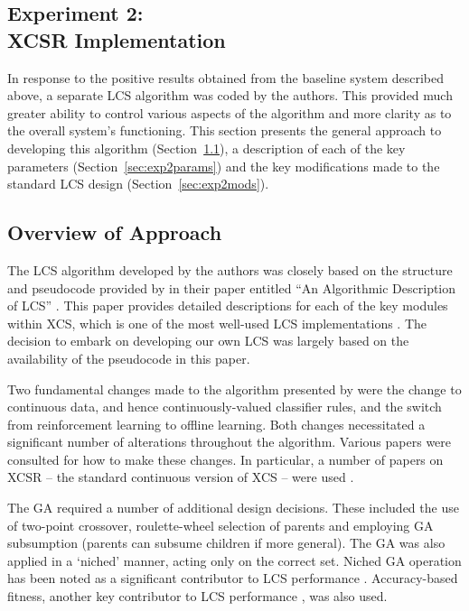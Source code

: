 \documentclass[11pt]{article}
\begin{document}
\begin{multicols}{2}
\section{Experiment 2:\\XCSR Implementation}
\label{sec:exp2}

In response to the positive results obtained from the baseline system described above, a separate LCS algorithm was coded by the authors. This provided much greater ability to control various aspects of the algorithm and more clarity as to the overall system's functioning. This section presents the general approach to developing this algorithm (Section~\ref{sec:exp2appr}), a description of each of the key parameters (Section~\ref{sec:exp2params}) and the key modifications made to the standard LCS design (Section~\ref{sec:exp2mods}).





\subsection{Overview of Approach}
\label{sec:exp2appr}

The LCS algorithm developed by the authors was closely based on the structure and pseudocode provided by \citeauthor{Butz2000} in their paper entitled ``An Algorithmic Description of LCS'' \cite{Butz2000}. This paper provides detailed descriptions for each of the key modules within XCS, which is one of the most well-used LCS implementations \cite{Sigaud2007}. The decision to embark on developing our own LCS was largely based on the availability of the pseudocode in this paper.

Two fundamental changes made to the algorithm presented by \citeauthor{Butz2000} were the change to continuous data, and hence continuously-valued classifier rules, and the switch from reinforcement learning to offline learning. Both changes necessitated a significant number of alterations throughout the algorithm. Various papers were consulted for how to make these changes. In particular, a number of papers on XCSR -- the standard continuous version of XCS -- were used \cite{Sowden2007,Stone2003,Wilson2000,Behdad2012}.

The GA required a number of additional design decisions. These included the use of two-point crossover, roulette-wheel selection of parents and employing GA subsumption (parents can subsume children if more general). The GA was also applied in a `niched' manner, acting only on the correct set. Niched GA operation has been noted as a significant contributor to LCS performance \cite{Lanzi2008}. Accuracy-based fitness, another key contributor to LCS performance \cite{Lanzi2008}, was also used.


\end{multicols}
\end{document}
